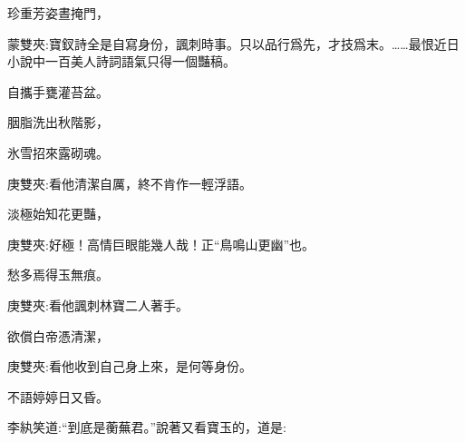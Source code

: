 \begin{poem}
    \begin{pl}珍重芳姿晝掩門，\end{pl}
    \begin{note}蒙雙夾:寶釵詩全是自寫身份，諷刺時事。只以品行爲先，才技爲末。……最恨近日小說中一百美人詩詞語氣只得一個豔稿。\end{note}

    \begin{pl}自攜手甕灌苔盆。\end{pl}

    \begin{pl}胭脂洗出秋階影，\end{pl}

    \begin{pl}氷雪招來露砌魂。\end{pl}
    \begin{note}庚雙夾:看他清潔自厲，終不肯作一輕浮語。\end{note}

    \begin{pl}淡極始知花更豔，\end{pl}
    \begin{note}庚雙夾:好極！高情巨眼能幾人哉！正“鳥鳴山更幽”也。\end{note}

    \begin{pl}愁多焉得玉無痕。\end{pl}
    \begin{note}庚雙夾:看他諷刺林寶二人著手。\end{note}

    \begin{pl}欲償白帝憑清潔，\end{pl}
    \begin{note}庚雙夾:看他收到自己身上來，是何等身份。\end{note}

    \begin{pl}不語婷婷日又昏。\end{pl}
\end{poem}


\begin{parag}
    李紈笑道:“到底是蘅蕪君。”說著又看寶玉的，道是:
\end{parag}


